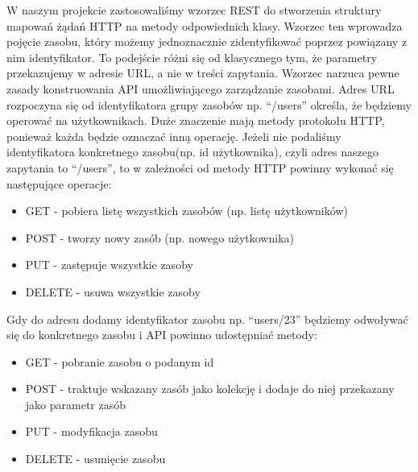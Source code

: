 W naszym projekcie zastosowaliśmy wzorzec REST do stworzenia struktury mapowań żądań HTTP na metody odpowiednich klasy. Wzorzec ten wprowadza pojęcie zasobu, który możemy jednoznacznie zidentyfikować poprzez powiązany z nim identyfikator. To podejście różni się od klasycznego tym, że parametry przekazujemy w adresie URL, a nie w treści zapytania. Wzorzec narzuca pewne zasady konstruowania API umożliwiającego zarządzanie zasobami. Adres URL rozpoczyna się od identyfikatora grupy zasobów np. “/users” określa, że będziemy operować na użytkownikach. Duże znaczenie mają metody protokołu HTTP, ponieważ każda będzie oznaczać inną operację. Jeżeli nie podaliśmy identyfikatora konkretnego zasobu(np. id użytkownika), czyli adres naszego zapytania to “/users”, to w zależności od metody HTTP powinny wykonać się następujące operacje:

\begin{itemize}
\item GET - pobiera listę wszystkich zasobów (np. listę użytkowników)
\item POST - tworzy nowy zasób (np. nowego użytkownika)
\item PUT - zastępuje wszystkie zasoby
\item DELETE - usuwa wszystkie zasoby
\end{itemize}

Gdy do adresu dodamy identyfikator zasobu np. “users/23” będziemy odwoływać się do konkretnego zasobu i API powinno udostępniać metody:

\begin{itemize}
\item GET - pobranie zasobu o podanym id
\item POST - traktuje wskazany zasób jako kolekcję i dodaje do niej przekazany jako parametr zasób
\item PUT - modyfikacja zasobu
\item DELETE - usunięcie zasobu
\end{itemize}


